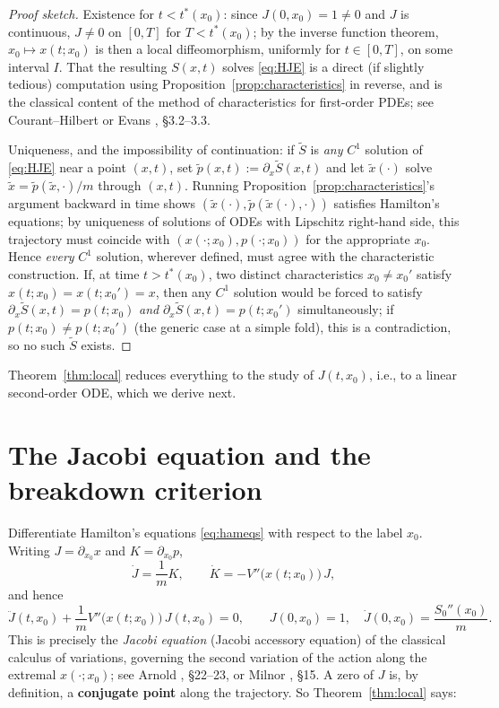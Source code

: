 \documentclass[11pt]{article}
\theoremstyle{plain}
\theoremstyle{definition}
\theoremstyle{remark}
\begin{document}
\begin{proof}[Proof sketch]
Existence for $t<t^\ast(x_0)$: since $J(0,x_0)=1\ne0$ and $J$ is continuous,
    $J\ne0$ on $[0,T]$ for $T<t^\ast(x_0)$; by the inverse function theorem,
    $x_0\mapsto x(t;x_0)$ is then a local diffeomorphism, uniformly for
    $t\in[0,T]$, on some interval $I$. That the resulting $S(x,t)$ solves
    \eqref{eq:HJE} is a direct (if slightly tedious) computation using
    Proposition~\ref{prop:characteristics} in reverse, and is the classical
    content of the method of characteristics for first-order PDEs; see
    Courant--Hilbert \cite{CourantHilbert} or Evans \cite{Evans}, \S3.2--3.3.

Uniqueness, and the impossibility of continuation: if $\tilde S$ is \emph{any}
    $C^1$ solution of \eqref{eq:HJE} near a point $(x,t)$, set $\tilde
    p(x,t):=\partial_x\tilde S(x,t)$ and let $\tilde x(\cdot)$ solve
    $\dot{\tilde x}=\tilde p(\tilde x,\cdot)/m$ through $(x,t)$. Running
    Proposition~\ref{prop:characteristics}'s argument backward in time shows
    $(\tilde x(\cdot),\tilde p(\tilde x(\cdot),\cdot))$ satisfies Hamilton's
    equations; by uniqueness of solutions of ODEs with Lipschitz right-hand
    side, this trajectory must coincide with $(x(\cdot;x_0),p(\cdot;x_0))$ for
    the appropriate $x_0$. Hence \emph{every} $C^1$ solution, wherever defined,
    must agree with the characteristic construction. If, at time
    $t>t^\ast(x_0)$, two distinct characteristics $x_0\ne x_0'$ satisfy
    $x(t;x_0)=x(t;x_0')=x$, then any $C^1$ solution would be forced to satisfy
    $\partial_x\tilde S(x,t) = p(t;x_0)$ \emph{and} $\partial_x\tilde
    S(x,t)=p(t;x_0')$ simultaneously; if $p(t;x_0)\ne p(t;x_0')$ (the generic
    case at a simple fold), this is a contradiction, so no such $\tilde S$
    exists.
\end{proof}

Theorem~\ref{thm:local} reduces everything to the study of $J(t,x_0)$, i.e., to
a linear second-order ODE, which we derive next.

\section{The Jacobi equation and the breakdown criterion}
\label{sec:jacobi}

Differentiate Hamilton's equations \eqref{eq:hameqs} with respect to the label
$x_0$. Writing $J=\partial_{x_0}x$ and $K=\partial_{x_0}p$,
\[
\dot J = \frac{1}{m}K, \qquad \dot K = -V''\big(x(t;x_0)\big)\,J,
\]
and hence
\begin{equation}
\ddot J(t,x_0) + \frac{1}{m}V''\big(x(t;x_0)\big)\,J(t,x_0) = 0, \qquad J(0,x_0)=1, \quad \dot J(0,x_0) = \frac{S_0''(x_0)}{m}.
\label{eq:jacobi}
\end{equation}
This is precisely the \emph{Jacobi equation} (Jacobi accessory equation) of the
classical calculus of variations, governing the second variation of the action
along the extremal $x(\cdot;x_0)$; see Arnold \cite{Arnold}, \S22--23, or
Milnor \cite{Milnor}, \S15. A zero of $J$ is, by definition, a
\textbf{conjugate point} along the trajectory. So Theorem~\ref{thm:local} says:
\end{document}
